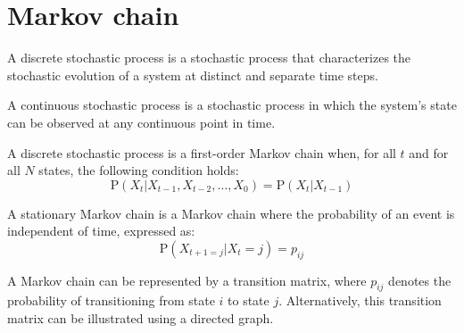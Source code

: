 \section{Markov chain}

\begin{definition}
    A discrete stochastic process is a stochastic process that characterizes the stochastic evolution of a system at distinct and separate time steps.
\end{definition}
\begin{definition}
    A continuous stochastic process is a stochastic process in which the system's state can be observed at any continuous point in time.
\end{definition}
\begin{definition}
    A discrete stochastic process is a first-order Markov chain when, for all $t$ and for all $N$ states, the following condition holds:    \[\text{P}\left(X_t|X_{t-1},X_{t-2},\dots,X_0\right)=\text{P}(X_t|X_{t-1})\] 
\end{definition}
\begin{definition}
    A stationary Markov chain is a Markov chain where the probability of an event is independent of time, expressed as:
    \[\text{P}\left(X_{t+1=j}|X_t=j\right)=p_{ij}\] 
\end{definition}

A Markov chain can be represented by a transition matrix, where $p_{ij}$ denotes the probability of transitioning from state $i$ to state $j$. 
Alternatively, this transition matrix can be illustrated using a directed graph.

